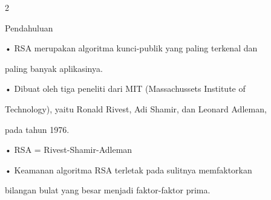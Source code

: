 \documentclass{article}
\begin{document}

2

Pendahuluan

• RSA merupakan algoritma kunci-publik yang paling terkenal dan 

paling banyak aplikasinya.

• Dibuat oleh tiga peneliti dari MIT (Massachussets Institute of 

Technology), yaitu Ronald Rivest, Adi Shamir, dan Leonard Adleman, 

pada tahun 1976. 

• RSA = Rivest-Shamir-Adleman

• Keamanan algoritma RSA terletak pada sulitnya memfaktorkan 

bilangan bulat yang besar menjadi faktor-faktor prima.
\end{document}
